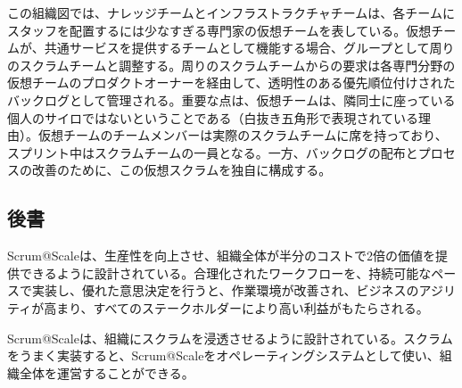 \documentclass[12pt,a4paper,parskip=full]{scrartcl}
\begin{document}

この組織図では、ナレッジチームとインフラストラクチャチームは、各チームにスタッフを配置するには少なすぎる専門家の仮想チームを表している。仮想チームが、共通サービスを提供するチームとして機能する場合、グループとして周りのスクラムチームと調整する。周りのスクラムチームからの要求は各専門分野の仮想チームのプロダクトオーナーを経由して、透明性のある優先順位付けされたバックログとして管理される。重要な点は、仮想チームは、隣同士に座っている個人のサイロではないということである（白抜き五角形で表現されている理由）。仮想チームのチームメンバーは実際のスクラムチームに席を持っており、スプリント中はスクラムチームの一員となる。一方、バックログの配布とプロセスの改善のために、この仮想スクラムを独自に構成する。

\subsection{後書}\label{End-Note}

Scrum@Scaleは、生産性を向上させ、組織全体が半分のコストで2倍の価値を提供できるように設計されている。合理化されたワークフローを、持続可能なペースで実装し、優れた意思決定を行うと、作業環境が改善され、ビジネスのアジリティが高まり、すべてのステークホルダーにより高い利益がもたらされる。

Scrum@Scaleは、組織にスクラムを浸透させるように設計されている。スクラムをうまく実装すると、Scrum@Scaleをオペレーティングシステムとして使い、組織全体を運営することができる。
\end{document}
